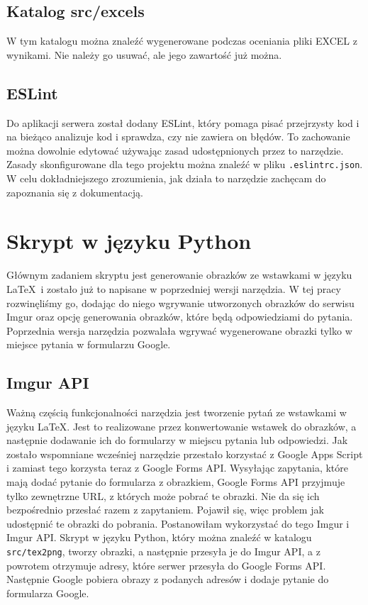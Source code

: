 \subsection{Katalog src/excels}
W tym katalogu można znaleźć wygenerowane podczas oceniania pliki EXCEL z wynikami. Nie należy go
usuwać, ale jego zawartość już można.

\subsection{ESLint}
Do aplikacji serwera został dodany ESLint, który pomaga pisać przejrzysty kod i na bieżąco
analizuje kod i sprawdza, czy nie zawiera on błędów. To zachowanie można dowolnie edytować używając 
zasad udostępnionych przez to narzędzie. Zasady skonfigurowane dla tego projektu można znaleźć 
w pliku \texttt{.eslintrc.json}. W celu dokładniejszego zrozumienia, jak działa to narzędzie 
zachęcam do zapoznania się z dokumentacją.

\section{Skrypt w języku Python}

Głównym zadaniem skryptu jest generowanie obrazków ze wstawkami w języku \LaTeX \ i zostało
już to napisane w poprzedniej wersji narzędzia. W tej pracy rozwinęliśmy go, dodając do
niego wgrywanie utworzonych obrazków do serwisu Imgur oraz opcję generowania
obrazków, które będą odpowiedziami do pytania. Poprzednia wersja narzędzia pozwalała
wgrywać wygenerowane obrazki tylko w miejsce pytania w formularzu Google.

\subsection{Imgur API}
Ważną częścią funkcjonalności narzędzia jest tworzenie pytań ze wstawkami w języku \LaTeX.
Jest to realizowane przez konwertowanie wstawek do obrazków, a następnie dodawanie ich do 
formularzy w miejscu pytania lub odpowiedzi. Jak zostało wspomniane wcześniej narzędzie
przestało korzystać z Google Apps Script i zamiast tego korzysta teraz z Google Forms API.
Wysyłając zapytania, które mają dodać pytanie do formularza z obrazkiem, Google Forms API
przyjmuje tylko zewnętrzne URL, z których może pobrać te obrazki. Nie da się ich
bezpośrednio przesłać razem z zapytaniem. Pojawił się, więc problem jak udostępnić te
obrazki do pobrania. Postanowiłam wykorzystać do tego Imgur i Imgur API. Skrypt w języku Python,
który można znaleźć w katalogu \texttt{src/tex2png}, tworzy obrazki, a następnie przesyła je 
do Imgur API, a z powrotem otrzymuje adresy, które serwer przesyła do Google Forms API.
Następnie Google pobiera obrazy z podanych adresów i dodaje pytanie do formularza Google.

